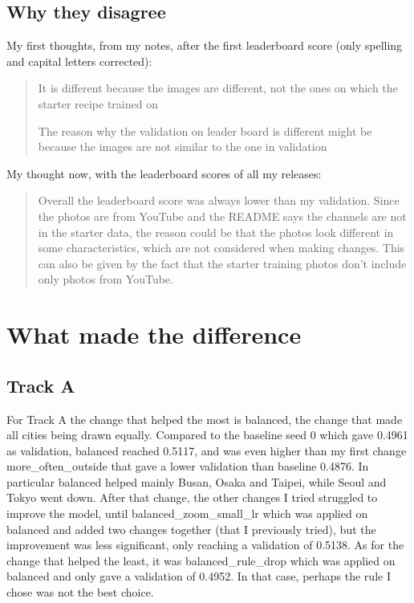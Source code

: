 \documentclass[11pt]{article}
\begin{document}
\subsection*{Why they disagree}
My first thoughts, from my notes, after the first leaderboard score (only spelling and capital letters corrected):
\begin{quote}\small
It is different because the images are different, not the ones on which the starter recipe trained on

The reason why the validation on leader board is different might be because the images are not similar to the one in validation
\end{quote}

My thought now, with the leaderboard scores of all my releases:
\begin{quote}\small
Overall the leaderboard score was always lower than my validation. Since the photos are from YouTube and the README says the channels are not in the starter data, the reason could be that the photos look different in some characteristics, which are not considered when making changes. This can also be given by the fact that the starter training photos don't include only photos from YouTube.
\end{quote}

\section*{What made the difference}

\subsection*{Track A}
For Track A the change that helped the most is balanced, the change that made all cities being drawn equally. Compared to the baseline seed 0 which gave 0.4961 as validation, balanced reached 0.5117, and was even higher than my first change more\_often\_outside that gave a lower validation than baseline 0.4876. In particular balanced helped mainly Busan, Osaka and Taipei, while Seoul and Tokyo went down. After that change, the other changes I tried struggled to improve the model, until balanced\_zoom\_small\_lr which was applied on balanced and added two changes together (that I previously tried), but the improvement was less significant, only reaching a validation of 0.5138. As for the change that helped the least, it was balanced\_rule\_drop which was applied on balanced and only gave a validation of 0.4952. In that case, perhaps the rule I chose was not the best choice.
\end{document}
